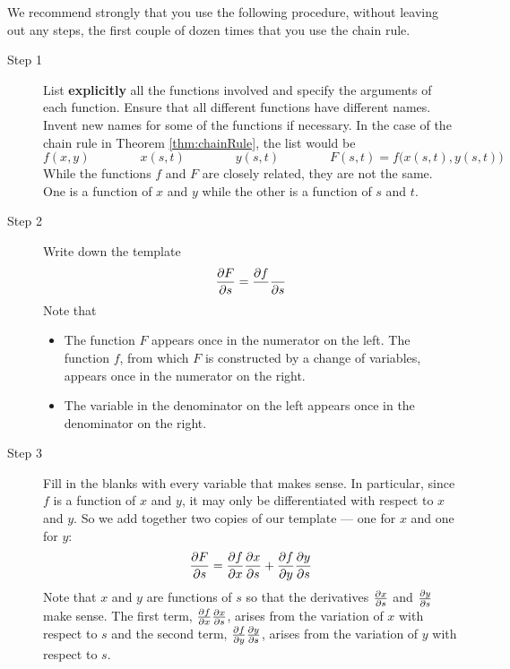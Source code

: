 We recommend strongly that you use the following procedure, without leaving
out any steps, the first couple of dozen times that you use the chain rule.
\begin{description}
\item[Step 1] 
List \textbf{explicitly} all the functions involved and specify the
arguments of each function. Ensure that all different functions have different
names. Invent new names for some of the functions if necessary. In the
case of the chain rule in Theorem  \ref{thm:chainRule}, the list would be
\begin{equation*}
f(x,y)\qquad\qquad
x(s,t)\qquad\qquad
y(s,t)\qquad\qquad
F(s,t)=f\big(x(s,t),y(s,t)\big)
\end{equation*}
While the functions $f$ and $F$ are closely related, they are not the same.
One is a function of $x$ and $y$ while the other is a function of $s$ and
$t$.
\item[Step 2] 
Write down the template
\begin{equation*}
\pdiff{F}{s}=\frac{\partial f}{ }\frac{ }{\partial s}
\end{equation*}
Note that 
\begin{itemize}
\item
The function $F$ appears once in the numerator on the left.
The function $f$, from which $F$ is constructed by a change of variables,
appears once in the numerator on the right.

\item
The variable in the denominator on the left appears once in the
denominator on the right. 
\end{itemize}

\item[Step 3] 
Fill in the blanks with every variable that makes sense. In 
particular, since $f$ is a function of $x$ and $y$, it may only be 
differentiated with respect to $x$ and $y$. So we add together
two copies of our template --- one for $x$ and one for $y$:
\begin{equation*}
\pdiff{F}{s}
=\pdiff{f}{x }\pdiff{x }{s}
+\pdiff{f}{y }\pdiff{y }{s}
\end{equation*}
Note that $x$ and $y$ are functions of $s$ so that the derivatives
$\pdiff{x }{s}$ and $\pdiff{y }{s}$ make sense.
The first term, $\pdiff{f}{x }\pdiff{x }{s}$, arises from the variation
of $x$ with respect to $s$ and the second term, $\pdiff{f}{y }\pdiff{y }{s}$, 
arises from the variation of $y$ with respect to $s$.



\end{description}

